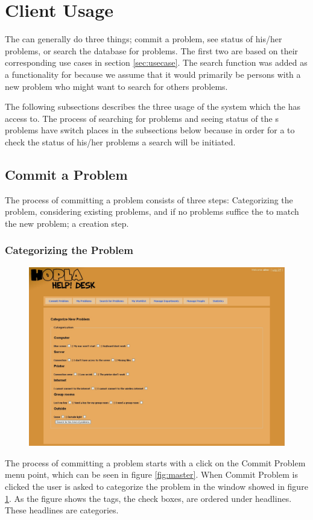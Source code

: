 \section{Client Usage}
\label{sec:client_usage}
The \aclient[] can generally do three things; commit a problem, see status of his/her problems, or search the database for problems.
The first two are based on their corresponding use cases in section \ref{sec:usecase}.
The search function was added as a functionality for \aclient[] because we assume that it would primarily be persons with a new problem who might want to search for others problems.

The following subsections describes the three usage of the system which the \aclient[] has access to.
The process of searching for problems and seeing status of the \aclient[]s problems have switch places in the subsections below because in order for a \aclient[] to check the status of his/her problems a search will be initiated.

\subsection{Commit a Problem}
\label{sub:commit}
The process of committing a problem consists of three steps: Categorizing the problem, considering existing problems, and if no problems suffice the to match the new problem; a creation step.

\subsubsection{Categorizing the Problem}
\begin{figure}[htb]
	\centering
		\includegraphics[width=1.00\textwidth, clip=true, trim=2.9cm 0.5cm 15cm 8cm]{input/implementation/program_presentation/commit.png}
	\label{fig:commit}
\end{figure}
The process of committing a problem starts with a click on the Commit Problem menu point, which can be seen in figure \ref{fig:master}.
When Commit Problem is clicked the user is asked to categorize the problem in the window showed in figure \ref{fig:commit}.
As the figure shows the tags, the check boxes, are ordered under headlines.
These headlines are categories.

